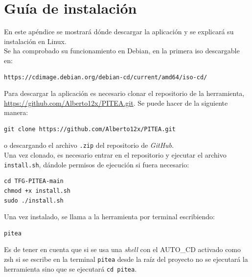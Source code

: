 \chapter{Guía de instalación}
\label{Appendix:Key1}

En este apéndice se mostrará dónde descargar la aplicación y se explicará su instalación en Linux.\\

Se ha comprobado su funcionamiento en Debian, en la primera iso descargable en:
\begin{verbatim}
https://cdimage.debian.org/debian-cd/current/amd64/iso-cd/
\end{verbatim}

Para descargar la aplicación es necesario clonar el repositorio de la herramienta, \url{https://github.com/Alberto12x/PITEA.git}. Se puede hacer de la siguiente manera:

\begin{verbatim}
git clone https://github.com/Alberto12x/PITEA.git
 \end{verbatim}
o descargando el archivo \texttt{.zip} del repositorio de \textit{GitHub}.\\

Una vez clonado, es necesario entrar en el repositorio y ejecutar el archivo \texttt{install.sh}, dándole permisos de ejecución si fuera necesario:
\begin{verbatim}
cd TFG-PITEA-main
chmod +x install.sh
sudo ./install.sh
\end{verbatim}
Una vez instalado, se llama a la herramienta por terminal escribiendo:
\begin{verbatim}
pitea
\end{verbatim}



\begin{notaimportante}
Es de tener en cuenta que si se usa una \textit{shell} con el AUTO\_CD activado como zsh si se escribe en la terminal \texttt{pitea} desde la raíz del proyecto no se ejecutará la herramienta sino que se ejecutará \texttt{cd pitea}.
\end{notaimportante}
